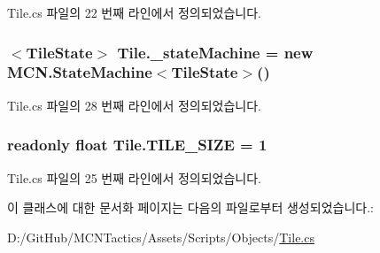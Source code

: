 Tile.\+cs 파일의 22 번째 라인에서 정의되었습니다.

\subsubsection[{\texorpdfstring{\+\_\+state\+Machine}{_stateMachine}}]{$<${\bf Tile\+State}$>$ Tile.\+\_\+state\+Machine = new {\bf M\+C\+N.\+State\+Machine}$<${\bf Tile\+State}$>$()\hspace{0.3cm}{\ttfamily [private]}}\hypertarget{class_tile_a822a1bffe56b1193b8c5c61070ea7827}{}\label{class_tile_a822a1bffe56b1193b8c5c61070ea7827}


Tile.\+cs 파일의 28 번째 라인에서 정의되었습니다.

\subsubsection[{\texorpdfstring{T\+I\+L\+E\+\_\+\+S\+I\+ZE}{TILE_SIZE}}]{\setlength{\rightskip}{0pt plus 5cm}readonly float Tile.\+T\+I\+L\+E\+\_\+\+S\+I\+ZE = 1\hspace{0.3cm}{\ttfamily [static]}}\hypertarget{class_tile_a51b7dea4344573ba12a461a32517e683}{}\label{class_tile_a51b7dea4344573ba12a461a32517e683}


Tile.\+cs 파일의 25 번째 라인에서 정의되었습니다.



이 클래스에 대한 문서화 페이지는 다음의 파일로부터 생성되었습니다.\+:\begin{DoxyCompactItemize}
\item 
D\+:/\+Git\+Hub/\+M\+C\+N\+Tactics/\+Assets/\+Scripts/\+Objects/\hyperlink{_tile_8cs}{Tile.\+cs}\end{DoxyCompactItemize}
